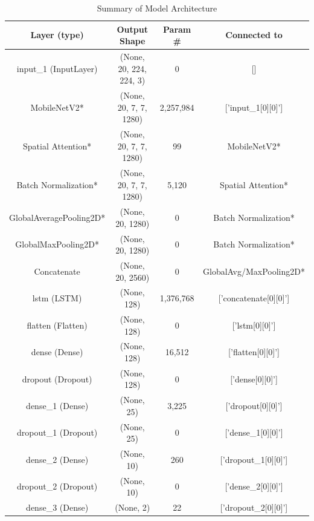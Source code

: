 \begin{table}[H]
\centering
\caption{Summary of Model Architecture}
\begin{tabular}{c|c|c|c}
\hline
\textbf{Layer (type)}            & \textbf{Output Shape}       & \textbf{Param \#} & \textbf{Connected to}               \\ \hline
input\_1 (InputLayer)            & (None, 20, 224, 224, 3)     & 0                 & []                                   \\ 
MobileNetV2* & (None, 20, 7, 7, 1280)      & 2,257,984         & ['input\_1[0][0]']                   \\ 
Spatial Attention* & (None, 20, 7, 7, 1280)      & 99                & MobileNetV2*         \\ 
Batch Normalization* & (None, 20, 7, 7, 1280)      & 5,120             & Spatial Attention*      \\
GlobalAveragePooling2D* & (None, 20, 1280)            & 0                 & Batch Normalization*    \\
GlobalMaxPooling2D* & (None, 20, 1280)            & 0                 & Batch Normalization*     \\ 
Concatenate      & (None, 20, 2560)            & 0                 & GlobalAvg/MaxPooling2D*\\
lstm (LSTM)                      & (None, 128)                 & 1,376,768         & ['concatenate[0][0]']               \\ 
flatten (Flatten)                & (None, 128)                 & 0                 & ['lstm[0][0]']                      \\ 
dense (Dense)                    & (None, 128)                 & 16,512            & ['flatten[0][0]']                   \\ 
dropout (Dropout)                & (None, 128)                 & 0                 & ['dense[0][0]']                     \\ 
dense\_1 (Dense)                 & (None, 25)                  & 3,225             & ['dropout[0][0]']                   \\ 
dropout\_1 (Dropout)             & (None, 25)                  & 0                 & ['dense\_1[0][0]']                  \\ 
dense\_2 (Dense)                 & (None, 10)                  & 260               & ['dropout\_1[0][0]']                \\ 
dropout\_2 (Dropout)             & (None, 10)                  & 0                 & ['dense\_2[0][0]']                  \\ 
dense\_3 (Dense)                 & (None, 2)                   & 22                & ['dropout\_2[0][0]']                \\ \hline
\end{tabular}
\label{table:modelsummary}
\end{table}

